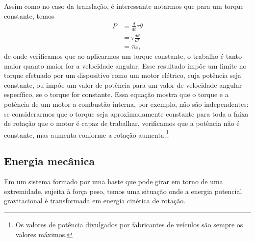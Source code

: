 Assim como no caso da translação, é interessante notarmos que para um torque constante, temos
\begin{align}
    P &= \frac{d}{dt} \tau \theta \\
    &= \tau \frac{d\theta}{dt} \\
    &= \tau \omega,
\end{align}
%
de onde verificamos que ao aplicarmos um torque constante, o trabalho é tanto maior quanto maior for a velocidade angular. Esse resultado impôe um limite no torque efetuado por um dispositivo como um motor elétrico, cuja potência seja constante, ou impôe um valor de potência para um valor de velocidade angular específico, se o torque for constante. Essa equação mostra que o torque e a potência de um motor a combustão interna, por exemplo, não são independentes: se considerarmos que o torque seja aproximadamente constante para toda a faixa de rotação que o motor é capaz de trabalhar, verificamos que a potência não é constante, mas aumenta conforme a rotação aumenta.\footnote{Os valores de potência divulgados por fabricantes de veículos são sempre os valores máximos.}



\subsection{Energia mecânica}

\begin{marginfigure}
\centering
{}
\caption{Em um sistema formado por uma haste que pode girar em torno de uma extremidade, sujeita à força peso, temos uma situação onde a energia potencial gravitacional é transformada em energia cinética de rotação. \label{Fig:EnergiaMecanicaNaRotacao}}
\end{marginfigure}

